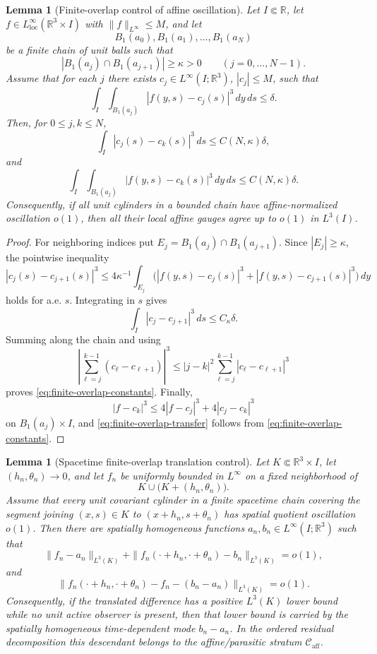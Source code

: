\documentclass[11pt]{amsart}
\numberwithin{equation}{section}
\theoremstyle{plain}
\newtheorem{lemma}[theorem]{Lemma}
\theoremstyle{definition}
\theoremstyle{remark}
\newcommand{\loc}{\mathrm{loc}}
\newcommand{\Caff}{\mathcal C_{\mathrm{aff}}}
\begin{document}
\begin{lemma}[Finite-overlap control of affine oscillation]
\label{lem:finite-overlap-affine-oscillation}
Let \(I\Subset\mathbb R\), let \(f\in L^\infty_{\loc}(\mathbb R^3\times I)\)
with \(\|f\|_{L^\infty}\le M\), and let
\[
   B_1(a_0),B_1(a_1),\dots,B_1(a_N)
\]
be a finite chain of unit balls such that
\[
   |B_1(a_j)\cap B_1(a_{j+1})|\ge\kappa>0
   \qquad (j=0,\dots,N-1).
\]
Assume that for each \(j\) there exists
\(c_j\in L^\infty(I;\mathbb R^3)\), \(|c_j|\le M\), such that
\[
   \int_I\int_{B_1(a_j)}|f(y,s)-c_j(s)|^3\,dy\,ds\le \delta .
\]
Then, for \(0\le j,k\le N\),
\begin{equation}\label{eq:finite-overlap-constants}
   \int_I |c_j(s)-c_k(s)|^3\,ds
   \le C(N,\kappa)\delta ,
\end{equation}
and
\begin{equation}\label{eq:finite-overlap-transfer}
   \int_I\int_{B_1(a_j)}|f(y,s)-c_k(s)|^3\,dy\,ds
   \le C(N,\kappa)\delta .
\end{equation}
Consequently, if all unit cylinders in a bounded chain have affine-normalized
oscillation \(o(1)\), then all their local affine gauges agree up to \(o(1)\)
in \(L^3(I)\).
\end{lemma}

\begin{proof}
For neighboring indices put \(E_j=B_1(a_j)\cap B_1(a_{j+1})\).  Since
\(|E_j|\ge\kappa\), the pointwise inequality
\[
   |c_j(s)-c_{j+1}(s)|^3
   \le
   4\kappa^{-1}\int_{E_j}
   \bigl(|f(y,s)-c_j(s)|^3+|f(y,s)-c_{j+1}(s)|^3\bigr)\,dy
\]
holds for a.e. \(s\).  Integrating in \(s\) gives
\[
   \int_I|c_j-c_{j+1}|^3\,ds\le C_\kappa\delta .
\]
Summing along the chain and using
\[
   \left|\sum_{\ell=j}^{k-1}(c_\ell-c_{\ell+1})\right|^3
   \le |j-k|^2\sum_{\ell=j}^{k-1}|c_\ell-c_{\ell+1}|^3
\]
proves \eqref{eq:finite-overlap-constants}.  Finally,
\[
   |f-c_k|^3\le4|f-c_j|^3+4|c_j-c_k|^3
\]
on \(B_1(a_j)\times I\), and
\eqref{eq:finite-overlap-transfer} follows from
\eqref{eq:finite-overlap-constants}.
\end{proof}

\begin{lemma}[Spacetime finite-overlap translation control]
\label{lem:spacetime-finite-overlap-translation}
Let \(K\Subset\mathbb R^3\times I\), let
\((h_n,\theta_n)\to0\), and let \(f_n\) be uniformly bounded in \(L^\infty\) on
a fixed neighborhood of
\[
   K\cup\bigl(K+(h_n,\theta_n)\bigr).
\]
Assume that every unit covariant cylinder in a finite spacetime chain covering
the segment joining \((x,s)\in K\) to \((x+h_n,s+\theta_n)\) has spatial
quotient oscillation \(o(1)\).  Then there are
spatially homogeneous functions \(a_n,b_n\in L^\infty(I;\mathbb R^3)\) such
that
\[
   \|f_n-a_n\|_{L^3(K)}
   +\|f_n(\cdot+h_n,\cdot+\theta_n)-b_n\|_{L^3(K)}
   =o(1),
\]
and
\[
   \|f_n(\cdot+h_n,\cdot+\theta_n)-f_n-(b_n-a_n)\|_{L^3(K)}=o(1).
\]
Consequently, if the translated difference has a positive \(L^3(K)\) lower
bound while no unit active observer is present, then that lower bound is
carried by the spatially homogeneous time-dependent mode \(b_n-a_n\).  In the
ordered residual decomposition this descendant belongs to the affine/parasitic stratum
\(\Caff\).
\end{lemma}
\end{document}
